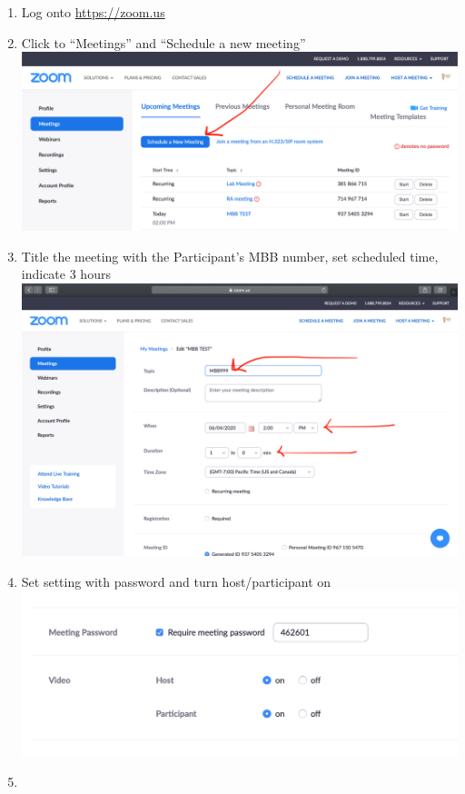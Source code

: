 \documentclass[]{book}
\providecommand{\tightlist}{%
  \setlength{\itemsep}{0pt}\setlength{\parskip}{0pt}}
\begin{document}
\begin{enumerate}
\def\labelenumi{\arabic{enumi}.}
\tightlist
\item
  Log onto \url{https://zoom.us}
\item
  Click to ``Meetings'' and ``Schedule a new meeting'' \includegraphics{images/zoom_link/1.png}
\item
  Title the meeting with the Participant's MBB number, set scheduled time, indicate 3 hours \includegraphics{images/zoom_link/2.png}
\item
  Set setting with password and turn host/participant on \includegraphics{images/zoom_link/3.png}
\item

\end{enumerate}
\end{document}

